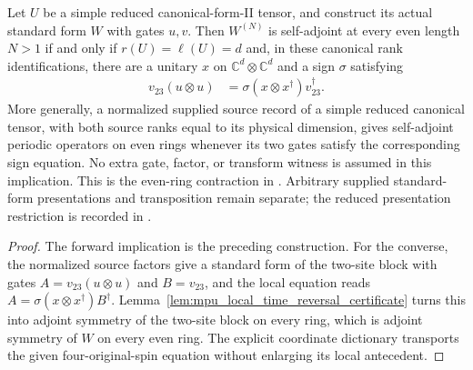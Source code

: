 \begin{lemma}
    \label{lem:mpu_canonical_even_local_time_reversal_iff}
    \leanok
    Let $U$ be a simple reduced canonical-form-II tensor, and construct its
    actual standard form $W$ with gates $u,v$. Then $W^{(N)}$ is self-adjoint
    at every even length $N>1$ if and only if $r(U)=\ell(U)=d$ and, in
    these canonical rank identifications, there are a unitary $x$ on
    $\mathbb C^d\otimes\mathbb C^d$ and a sign $\sigma$ satisfying
    \begin{align}
        v_{23}(u\otimes u)
         & =\sigma(x\otimes x^\dagger)v_{23}^\dagger.
    \end{align}
    More generally, a normalized supplied source record of a simple reduced
    canonical tensor, with both source ranks equal to its physical dimension,
    gives self-adjoint periodic operators on even rings whenever its two
    gates satisfy the corresponding sign equation. No extra gate, factor,
    or transform witness is assumed in this implication. This is the
    even-ring contraction in \cite[lines~1214--1236]{Cirac2017MPU}.
    Arbitrary supplied standard-form presentations and transposition remain
    separate; the reduced presentation restriction is recorded in
    \cite{gap:mpu_canonical_form_full_support}.
\end{lemma}

\begin{proof}\leanok
    The forward implication is the preceding construction. For the converse,
    the normalized source factors give a standard form of the two-site block
    with gates $A=v_{23}(u\otimes u)$ and $B=v_{23}$, and the local equation
    reads $A=\sigma(x\otimes x^\dagger)B^\dagger$.
    Lemma~\ref{lem:mpu_local_time_reversal_certificate} turns this into
    adjoint symmetry of the two-site block on every ring, which is adjoint
    symmetry of $W$ on every even ring. The explicit coordinate dictionary
    transports the given four-original-spin equation without enlarging its
    local antecedent.
\end{proof}


